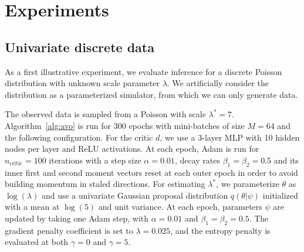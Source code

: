 \documentclass[twocolumn,superscriptaddress,aps]{revtex4-1}
\theoremstyle{plain}
\begin{document}
\section{Experiments}

\subsection{Univariate discrete data}

As a first illustrative experiment, we evaluate inference for a discrete Poisson
distribution with unknown scale parameter $\lambda$. We artificially consider
the distribution as a parameterized simulator, from which we can only
generate data.

The observed data is sampled from a Poisson with scale $\lambda^* = 7$.
Algorithm~\ref{alg:avo} is run for 300 epochs with mini-batches of size $M=64$
and the following configuration. For the critic $d$, we use a 3-layer MLP with 10
hidden nodes per layer and ReLU activations. At each epoch, Adam is run for
$n_\text{critic}=100$ iterations with a step size $\alpha=0.01$, decay rates
$\beta_1=\beta_2=0.5$ and its inner first and second moment vectors reset at
each outer epoch in order to avoid building momentum in staled directions.  For
estimating $\lambda^*$, we parameterize $\theta$ as $\log(\lambda)$ and use a univariate Gaussian proposal distribution
$q(\theta|\psi)$ initialized with a mean at $\log(5)$ and unit variance. At
each epoch, parameters $\psi$ are updated by taking one Adam step, with
$\alpha=0.01$ and $\beta_1=\beta_2=0.5$. The gradient penalty coefficient is set to
$\lambda=0.025$, and the entropy penalty is evaluated at both $\gamma=0$ and $\gamma=5$.
\end{document}
